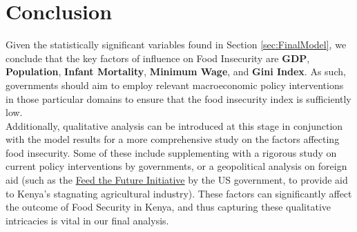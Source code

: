 \documentclass{article}
\begin{document}
\section{Conclusion}
Given the statistically significant variables found in Section \ref{sec:FinalModel}, we conclude that the key factors of influence on Food Insecurity are \textbf{GDP}, \textbf{Population}, \textbf{Infant Mortality}, \textbf{Minimum Wage}, and \textbf{Gini Index}. As such, governments should aim to employ relevant macroeconomic policy interventions in those particular domains to ensure that the food insecurity index is sufficiently low. \\

\noindent Additionally, qualitative analysis can be introduced at this stage in conjunction with the model results for a more comprehensive study on the factors affecting food insecurity. Some of these include supplementing with a rigorous study on current policy interventions by governments, or a geopolitical analysis on foreign aid (such as the \href{https://www.feedthefuture.gov/}{Feed the Future Initiative} by the US government, to provide aid to Kenya's stagnating agricultural industry). These factors can significantly affect the outcome of Food Security in Kenya, and thus capturing these qualitative intricacies is vital in our final analysis.
\end{document}

